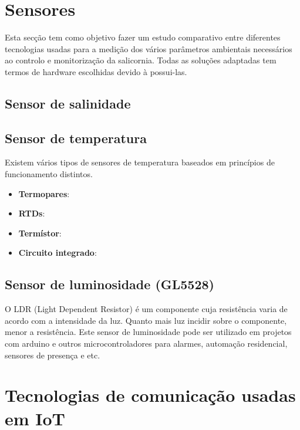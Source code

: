 \newpage
\section{Sensores}


Esta secção tem como objetivo fazer um estudo comparativo entre diferentes tecnologias usadas para a medição dos vários parâmetros ambientais necessários ao controlo e monitorização da salicornia. Todas as soluções adaptadas tem termos de hardware escolhidas devido à possui-las. 



\subsection{Sensor de salinidade}


\subsection{Sensor de temperatura }
Existem vários tipos de sensores de temperatura baseados em princípios de funcionamento distintos. 


\begin{itemize}
	\item \textbf{Termopares}: 
	\item \textbf{RTDs}:
	\item \textbf{Termístor}: 
	\item \textbf{Circuito integrado}: 
\end{itemize}








\newpage

\subsection{Sensor de luminosidade (GL5528)}


O LDR (Light Dependent Resistor) é um componente cuja resistência varia de acordo com a intensidade da luz. Quanto mais luz incidir sobre o componente, menor a resistência. Este sensor de luminosidade pode ser utilizado em projetos com arduino e outros microcontroladores para alarmes, automação residencial, sensores de presença e etc.






\section{Tecnologias de comunicação usadas em \ac{IoT}}

